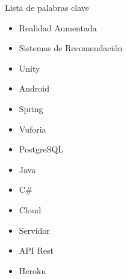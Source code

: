    Lista de palabras clave
   \begin{itemize}  
    \item Realidad Aumentada
    \item Sistemas de Recomendación
    \item Unity
    \item Android
    \item Spring
    \item Vuforia
    \item PostgreSQL
    \item Java
    \item C\#
    \item Cloud
    \item Servidor
    \item API Rest
    \item Heroku
  \end{itemize}
   


